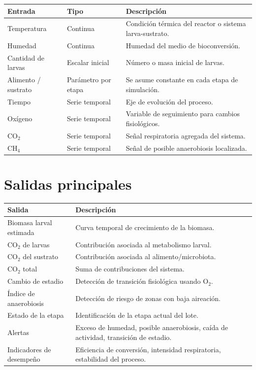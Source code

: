 \documentclass[12pt,a4paper]{report}
\begin{document}
\begin{longtable}{>{\raggedright\arraybackslash}p{3.4cm} >{\raggedright\arraybackslash}p{4.6cm} >{\raggedright\arraybackslash}p{5.5cm}}
\toprule
\textbf{Entrada} & \textbf{Tipo} & \textbf{Descripción} \\
\midrule
Temperatura & Continua & Condición térmica del reactor o sistema larva-sustrato. \\
Humedad & Continua & Humedad del medio de bioconversión. \\
Cantidad de larvas & Escalar inicial & Número o masa inicial de larvas. \\
Alimento / sustrato & Parámetro por etapa & Se asume constante en cada etapa de simulación. \\
Tiempo & Serie temporal & Eje de evolución del proceso. \\
Oxígeno & Serie temporal & Variable de seguimiento para cambios fisiológicos. \\
CO$_2$ & Serie temporal & Señal respiratoria agregada del sistema. \\
CH$_4$ & Serie temporal & Señal de posible anaerobiosis localizada. \\
\bottomrule
\end{longtable}

\section{Salidas principales}

\begin{longtable}{>{\raggedright\arraybackslash}p{4.5cm} >{\raggedright\arraybackslash}p{8.8cm}}
\toprule
\textbf{Salida} & \textbf{Descripción} \\
\midrule
Biomasa larval estimada & Curva temporal de crecimiento de la biomasa. \\
CO$_2$ de larvas & Contribución asociada al metabolismo larval. \\
CO$_2$ del sustrato & Contribución asociada al alimento/microbiota. \\
CO$_2$ total & Suma de contribuciones del sistema. \\
Cambio de estadio & Detección de transición fisiológica usando O$_2$. \\
Índice de anaerobiosis & Detección de riesgo de zonas con baja aireación. \\
Estado de la etapa & Identificación de la etapa actual del lote. \\
Alertas & Exceso de humedad, posible anaerobiosis, caída de actividad, transición de estadio. \\
Indicadores de desempeño & Eficiencia de conversión, intensidad respiratoria, estabilidad del proceso. \\
\bottomrule
\end{longtable}
\end{document}
